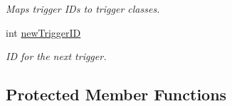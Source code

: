 \begin{DoxyCompactItemize}
\begin{DoxyCompactList}\small\item\em \-Maps trigger \-I\-Ds to trigger classes. \end{DoxyCompactList}\item 
\hypertarget{classObjectManager_a32a29f2b415ac93811605013539af8aa}{
int \hyperlink{classObjectManager_a32a29f2b415ac93811605013539af8aa}{new\-Trigger\-I\-D}}
\label{d6/d6f/classObjectManager_a32a29f2b415ac93811605013539af8aa}

\begin{DoxyCompactList}\small\item\em \-I\-D for the next trigger. \end{DoxyCompactList}\end{DoxyCompactItemize}
\subsection*{\-Protected \-Member \-Functions}

